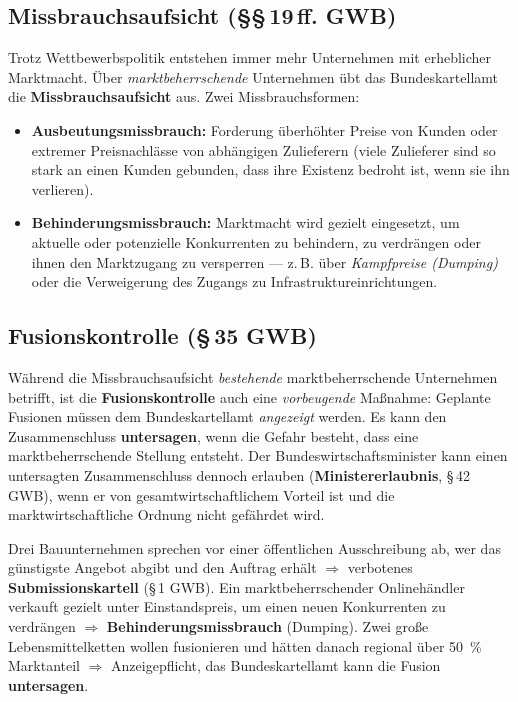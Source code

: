 \documentclass[11pt, a4paper]{article}
\begin{document}
\subsection{Missbrauchsaufsicht (\S\S\,19\,ff. GWB)}

Trotz Wettbewerbspolitik entstehen immer mehr Unternehmen mit erheblicher Marktmacht.
Über \emph{marktbeherrschende} Unternehmen übt das Bundeskartellamt die
\textbf{Missbrauchsaufsicht} aus. Zwei Missbrauchsformen:

\begin{itemize}
  \item \textbf{Ausbeutungsmissbrauch:} Forderung überhöhter Preise von Kunden oder
    extremer Preisnachlässe von abhängigen Zulieferern (viele Zulieferer sind so stark an
    einen Kunden gebunden, dass ihre Existenz bedroht ist, wenn sie ihn verlieren).
  \item \textbf{Behinderungsmissbrauch:} Marktmacht wird gezielt eingesetzt, um aktuelle
    oder potenzielle Konkurrenten zu behindern, zu verdrängen oder ihnen den Marktzugang
    zu versperren --- z.\,B. über \emph{Kampfpreise (Dumping)} oder die Verweigerung des
    Zugangs zu Infrastruktureinrichtungen.
\end{itemize}

\subsection{Fusionskontrolle (\S\,35 GWB)}

Während die Missbrauchsaufsicht \emph{bestehende} marktbeherrschende Unternehmen betrifft,
ist die \textbf{Fusionskontrolle} auch eine \emph{vorbeugende} Maßnahme: Geplante Fusionen
müssen dem Bundeskartellamt \emph{angezeigt} werden. Es kann den Zusammenschluss
\textbf{untersagen}, wenn die Gefahr besteht, dass eine marktbeherrschende Stellung
entsteht. Der Bundeswirtschaftsminister kann einen untersagten Zusammenschluss dennoch
erlauben (\textbf{Ministererlaubnis}, \S\,42 GWB), wenn er von gesamtwirtschaftlichem
Vorteil ist und die marktwirtschaftliche Ordnung nicht gefährdet wird.

\begin{beispiel}
Drei Bauunternehmen sprechen vor einer öffentlichen Ausschreibung ab, wer das günstigste
Angebot abgibt und den Auftrag erhält $\Rightarrow$ verbotenes
\textbf{Submissionskartell} (\S\,1 GWB). Ein marktbeherrschender Onlinehändler verkauft
gezielt unter Einstandspreis, um einen neuen Konkurrenten zu verdrängen $\Rightarrow$
\textbf{Behinderungsmissbrauch} (Dumping). Zwei große Lebensmittelketten wollen
fusionieren und hätten danach regional über 50~\% Marktanteil $\Rightarrow$ Anzeigepflicht,
das Bundeskartellamt kann die Fusion \textbf{untersagen}.
\end{beispiel}
\end{document}
